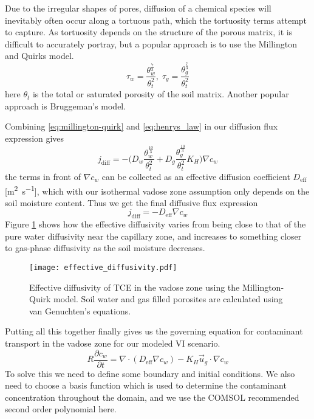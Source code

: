 Due to the irregular shapes of pores, diffusion of a chemical species will inevitably often occur along a tortuous path, which the tortuosity terms attempt to capture.
As tortuosity depends on the structure of the porous matrix, it is difficult to accurately portray, but a popular approach is to use the Millington and Quirks model\cite{millington_permeability_1961}.
\begin{equation}\label{eq:millington-quirk}
  \tau_w = \frac{\theta_w^{\frac{7}{3}}}{\theta_t^2}, \; \tau_g = \frac{\theta_g^{\frac{7}{3}}}{\theta_t^2}
\end{equation}
here $\theta_t$ is the total or saturated porosity of the soil matrix.
Another popular approach is Bruggeman's model.\par

Combining \eqref{eq:millington-quirk} and \eqref{eq:henrys_law} in our diffusion flux expression gives
\begin{equation}
  j_\mathrm{diff} = -\Big(D_w \frac{\theta_w^{\frac{10}{3}}}{\theta_t^2} + D_g \frac{\theta_g^{\frac{10}{3}}}{\theta_t^2} K_H\Big) \nabla c_w
\end{equation}
the terms in front of $\nabla c_w$ can be collected as an effective diffusion coefficient $D_\mathrm{eff}$ [\si{\metre\squared\per\second}], which with our isothermal vadose zone assumption only depends on the soil moisture content.
Thus we get the final diffusive flux expression
\begin{equation}
  j_\mathrm{diff} = - D_\mathrm{eff}\nabla c_w
\end{equation}
Figure \ref{fig:D_eff} shows how the effective diffusivity varies from being close to that of the pure water diffusivity near the capillary zone, and increases to something closer to gas-phase diffusivity as the soil moisture decreases.\par

\begin{figure}[htb!]
  \centering
  \texttt{[image: effective\_diffusivity.pdf]}
  \caption[Effective diffusivity of TCE in the vadose zone.]{Effective diffusivity of TCE in the vadose zone using the Millington-Quirk model. Soil water and gas filled porosites are calculated using van Genuchten's equations.}
  \label{fig:D_eff}
\end{figure}

Putting all this together finally gives us the governing equation for contaminant transport in the vadose zone for our modeled VI scenario.
\begin{equation}\label{eq:mass_transport}
  R \frac{\partial c_w}{\partial t} = \nabla \cdot (D_\mathrm{eff} \nabla c_w) - K_H \vec{u}_g \cdot \nabla c_w
\end{equation}
To solve this we need to define some boundary and initial conditions.
We also need to choose a basis function which is used to determine the contaminant concentration throughout the domain, and we use the COMSOL recommended second order polynomial here.\par

